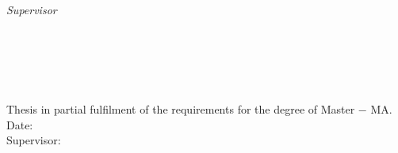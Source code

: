 \begin{titlepage}
	\vfill
	\begin{minipage}[t]{.27\textwidth}
		\raggedleft
		\textit{Supervisor}
	\end{minipage}
	\hspace*{15pt}
	\begin{minipage}[t]{.65\textwidth}
		\thesisFirstSupervisor
	\end{minipage} \\[10mm]

	\thesisDate \\

\end{titlepage}


\hfill
\vfill
{
	\small
	\textbf{\thesisName} \\
	\textit{\thesisTitle} \\
	Thesis in partial fulfilment of the requirements for the degree of Master − MA. \\
	Date: \thesisDate \\
	Supervisor: \thesisFirstSupervisor \\[1.5em]
	\textbf{\thesisUniversity} \\
	\thesisUniversityInstitute \\
	\thesisUniversityStreetAddress \\
	\thesisUniversityPostalCode\ \thesisUniversityCity
}
